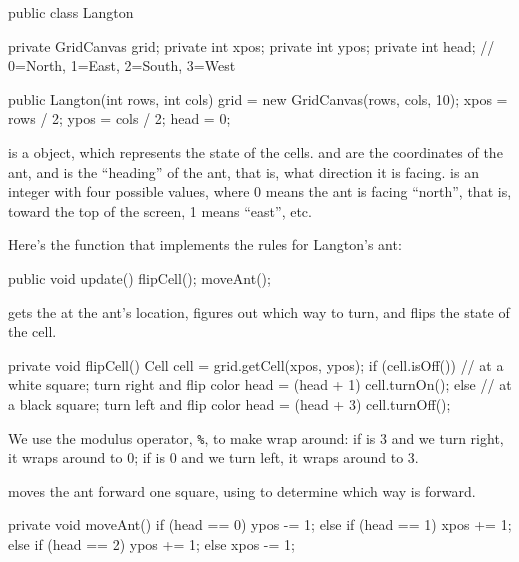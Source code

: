 \begin{code}
public class Langton {
    private GridCanvas grid;
    private int xpos;
    private int ypos;
    private int head; // 0=North, 1=East, 2=South, 3=West

    public Langton(int rows, int cols) {
        grid = new GridCanvas(rows, cols, 10);
        xpos = rows / 2;
        ypos = cols / 2;
        head = 0;
    }
}
\end{code}

 is a  object, which represents the state of the cells.
 and  are the coordinates of the ant, and  is the ``heading'' of the ant, that is, what direction it is facing.
 is an integer with four possible values, where 0 means the ant is facing ``north'', that is, toward the top of the screen, 1 means ``east'', etc.

Here's the  function that implements the rules for Langton's ant:

\begin{code}
public void update() {
    flipCell();
    moveAnt();
}
\end{code}

 gets the  at the ant's location, figures out which way to turn, and flips the state of the cell.

\begin{code}
private void flipCell() {
    Cell cell = grid.getCell(xpos, ypos);
    if (cell.isOff()) {
        // at a white square; turn right and flip color
        head = (head + 1) %
        cell.turnOn();
    } else {
        // at a black square; turn left and flip color
        head = (head + 3) %
        cell.turnOff();
    }
}
\end{code}

We use the modulus operator, \verb"%", to make  wrap around: if  is 3 and we turn right, it wraps around to 0; if  is 0 and we turn left, it wraps around to 3.

 moves the ant forward one square, using  to determine which way is forward.

\begin{code}
private void moveAnt() {
    if (head == 0) {
        ypos -= 1;
    } else if (head == 1) {
        xpos += 1;
    } else if (head == 2) {
        ypos += 1;
    } else {
        xpos -= 1;
    }
}
\end{code}


